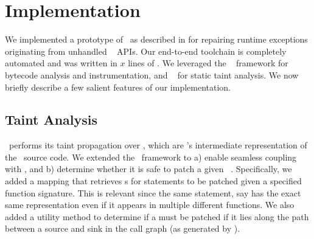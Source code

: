\section{Implementation}
\label{sec:implementation}

We implemented a prototype of \tool\ as described in  for
repairing runtime exceptions originating from unhandled \java\ 
APIs. Our end-to-end toolchain is completely automated and was written in $x$
lines of \java. We leveraged the \soot~\cite{soot} framework for bytecode
analysis and instrumentation, and \infoflow~\cite{infoflow} for static taint
analysis.
% 
% 
We now briefly describe a few salient features of our implementation.

\subsection{Taint Analysis}

\infoflow\ performs its taint propagation over , which are \soot's
intermediate representation of the \java\ source code. We extended the
\infoflow\ framework to a) enable seamless coupling with \soot, and b) determine
whether it is safe to patch a given \soot\ . Specifically, we added
a mapping that retrieves s for statements to be patched given a
specified function signature. This is relevant since the same statement, say
 has the exact same representation even if it appears in
multiple different functions. We also added a utility method to determine if a
 must be patched if it lies along the path between a source and sink 
in the call graph (as generated by \soot).


